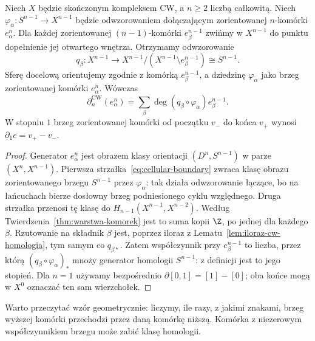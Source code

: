 \begin{twierdzenie}
\label{thm:formula-komorkowa}
Niech $X$ będzie skończonym kompleksem CW,
a $n\geq2$ liczbą całkowitą.
Niech $\varphi_\alpha:S^{n-1}\to X^{n-1}$
będzie odwzorowaniem dołączającym
zorientowanej $n$-komórki
$e_\alpha^n$.
Dla każdej zorientowanej
$(n-1)$-komórki $e_\beta^{n-1}$
zwińmy w $X^{n-1}$ do punktu
dopełnienie jej otwartego wnętrza.
Otrzymamy odwzorowanie
\[
 q_\beta:X^{n-1}\longrightarrow
 X^{n-1}/(X^{n-1}\setminus e_\beta^{n-1})
 \cong S^{n-1}.
\]
Sferę docelową orientujemy zgodnie z komórką $e_\beta^{n-1}$,
a dziedzinę $\varphi_\alpha$ jako brzeg zorientowanej komórki $e_\alpha^n$.
Wówczas
\begin{equation}\label{eq:formula-komorkowa}
 \partial_n^{\mathrm{CW}}(e_\alpha^n)
 =\sum_{\beta}
 \deg(q_\beta\circ\varphi_\alpha)
 e_\beta^{n-1}.
\end{equation}
W stopniu $1$ brzeg zorientowanej
komórki od początku $v_-$ do końca
$v_+$ wynosi $\partial_1e=v_+-v_-$.
\end{twierdzenie}
\begin{proof}
Generator $e_\alpha^n$ jest
obrazem klasy orientacji
$(D^n,S^{n-1})$ w parze
$(X^n,X^{n-1})$. Pierwsza
strzałka~\eqref{eq:cellular-boundary}
zwraca klasę obrazu
zorientowanego brzegu $S^{n-1}$
przez $\varphi_\alpha$:
tak działa odwzorowanie łączące,
bo na łańcuchach bierze
dosłowny brzeg podniesionego
cyklu względnego.
Druga strzałka przenosi tę
klasę do
$H_{n-1}(X^{n-1},X^{n-2})$.
Według
Twierdzenia~\ref{thm:warstwa-komorek}
jest to suma kopii $\Z$,
po jednej dla każdego $\beta$.
Rzutowanie na składnik $\beta$
jest, poprzez iloraz z
Lematu~\ref{lem:iloraz-cw-homologia},
tym samym co $q_{\beta*}$.
Zatem współczynnik przy
$e_\beta^{n-1}$ to liczba,
przez którą
$(q_\beta\circ\varphi_\alpha)_*$
mnoży generator homologii
$S^{n-1}$: z definicji
jest to jego stopień.
Dla $n=1$ używamy
bezpośrednio
$\partial[0,1]=[1]-[0]$;
oba końce mogą w $X^0$
oznaczać ten sam wierzchołek.
\end{proof}

Warto przeczytać wzór geometrycznie:
liczymy, ile razy, z jakimi znakami,
brzeg wyższej komórki przechodzi
przez daną komórkę niższą. Komórka
z niezerowym współczynnikiem brzegu
może zabić klasę homologii.

